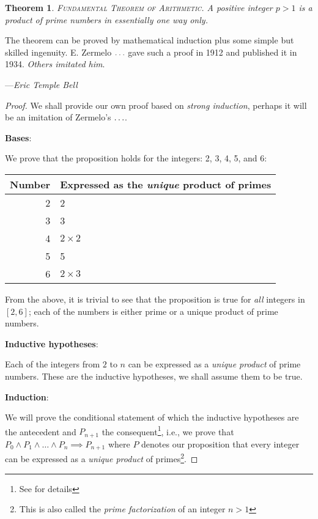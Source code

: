 \documentclass[a4paper]{article}
\newtheorem{theorem}{Theorem}
\begin{document}
\begin{theorem}
    \label{theorem: fta}
    \textsc{Fundamental Theorem of Arithmetic}. A positive integer $p>1$ is a product of prime numbers in essentially one way only.
\end{theorem}
\epigraph
{
    The theorem can be proved by mathematical induction plus some simple but skilled ingenuity. E. Zermelo $\mathellipsis$ gave such a proof in 1912 and published it in 1934. \emph{Others imitated him}.
}
{
    ---\textit{Eric Temple Bell \cite{math-queen-servant}}
}
\begin{proof}
    We shall provide our own proof based on \emph{strong induction}, perhaps it will be an imitation of Zermelo's $\mathellipsis$.

\noindent\textbf{Bases}:
        
        We prove that the proposition holds for the integers: 2, 3, 4, 5, and 6:
        \begin{center}
            \begin{tabular}{|r|l|}
            \hline
                Number & Expressed as the \emph{unique} product of primes\\
            \hline
            2 & 2\\
            \hline
            3 & 3\\
            \hline
            4 & $2\times 2$\\
            \hline
            5 & 5\\
            \hline
            6 & $2\times 3$\\
            \hline
            \end{tabular}
        \end{center}
        From the above, it is trivial to see that the proposition is true for \emph{all} integers in $[2, 6]$; each of the numbers is either prime or a unique product of prime numbers. 

\noindent\textbf{Inductive hypotheses}:

        Each of the integers from $2$ to $n$ can be expressed as a \emph{unique product} of prime numbers.  These are the inductive hypotheses, we shall assume them to be true.
        
\noindent\textbf{Induction}:

        We will prove the conditional statement of which the inductive hypotheses are the antecedent and $P_{n+1}$ the consequent\footnote{See \cite{suber-math-ind} for details}, i.e., we prove that $P_0 \wedge P_1 \wedge \dots \wedge P_n \implies P_{n+1}$ where $P$ denotes our proposition that every integer can be expressed as a \emph{unique product} of primes\footnote{This is also called the \emph{prime factorization} of an integer $n > 1$}.


\end{proof}
\end{document}
